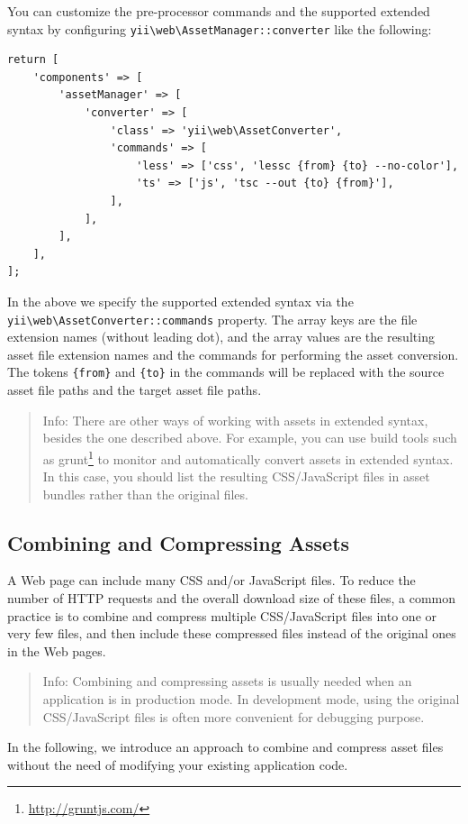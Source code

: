 You can customize the pre-processor commands and the supported extended syntax by configuring
\texttt{yii{\allowbreak{}\textbackslash}web{\allowbreak{}\textbackslash}AssetManager\allowbreak{}::\allowbreak{}converter} like the following:

\lstset{language=php}\begin{lstlisting}
return [
    'components' => [
        'assetManager' => [
            'converter' => [
                'class' => 'yii\web\AssetConverter',
                'commands' => [
                    'less' => ['css', 'lessc {from} {to} --no-color'],
                    'ts' => ['js', 'tsc --out {to} {from}'],
                ],
            ],
        ],
    ],
];
\end{lstlisting}
In the above we specify the supported extended syntax via the \texttt{yii{\allowbreak{}\textbackslash}web{\allowbreak{}\textbackslash}AssetConverter\allowbreak{}::\allowbreak{}commands} property.
The array keys are the file extension names (without leading dot), and the array values are the resulting
asset file extension names and the commands for performing the asset conversion. The tokens \lstinline|{from}| and \lstinline|{to}|
in the commands will be replaced with the source asset file paths and the target asset file paths.

\begin{quote}Info: There are other ways of working with assets in extended syntax, besides the one described above.
  For example, you can use build tools such as grunt\footnote{\url{http://gruntjs.com/}} to monitor and automatically
  convert assets in extended syntax. In this case, you should list the resulting CSS/JavaScript files in
  asset bundles rather than the original files.

\end{quote}
\subsection{Combining and Compressing Assets \label{structure-assets.md::combining-compressing-assets}}
A Web page can include many CSS and/or JavaScript files. To reduce the number of HTTP requests and the overall
download size of these files, a common practice is to combine and compress multiple CSS/JavaScript files into 
one or very few files, and then include these compressed files instead of the original ones in the Web pages.  

\begin{quote}Info: Combining and compressing assets is usually needed when an application is in production mode. 
  In development mode, using the original CSS/JavaScript files is often more convenient for debugging purpose.

\end{quote}
In the following, we introduce an approach to combine and compress asset files without the need of modifying
your existing application code.

